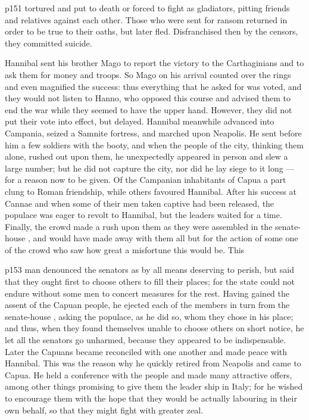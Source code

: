 p151 tortured and put to death or forced to fight as gladiators, pitting friends and relatives against each other. Those who were sent for ransom returned in order to be true to their oaths, but later fled. Disfranchised then by the censors, they committed suicide.

Hannibal sent his brother Mago to report the victory to the Carthaginians and to ask them for money and troops. So Mago on his arrival counted over the rings and even magnified the success: thus everything that he asked for was voted, and they would not listen to Hanno, who opposed this course and advised them to end the war while they seemed to have the upper hand. However, they did not put their vote into effect, but delayed. Hannibal meanwhile advanced into Campania, seized a Samnite fortress, and marched upon Neapolis. He sent before him a few soldiers with the booty, and when the people of the city, thinking them alone, rushed out upon them, he unexpectedly appeared in person and slew a large number; but he did not capture the city, nor did he lay siege to it long \texthebrew{—} for a reason now to be given. Of the Campanian inhabitants of Capua a part clung to Roman friendship, while others favoured Hannibal. After his success at Cannae and when some of their men taken captive had been released, the populace was eager to revolt to Hannibal, but the leaders waited for a time. Finally, the crowd made a rush upon them as they were assembled in the senate-house , and would have made away with them all but for the action of some one of the crowd who saw how great a misfortune this would be. This

p153 man denounced the senators as by all means deserving to perish, but said that they ought first to choose others to fill their places; for the state could not endure without some men to concert measures for the rest. Having gained the assent of the Capuan people, he ejected each of the members in turn from the senate-house , asking the populace, as he did so, whom they chose in his place; and thus, when they found themselves unable to choose others on short notice, he let all the senators go unharmed, because they appeared to be indispensable. Later the Capuans became reconciled with one another and made peace with Hannibal. This was the reason why he quickly retired from Neapolis and came to Capua. He held a conference with the people and made many attractive offers, among other things promising to give them the leader ­ship in Italy; for he wished to encourage them with the hope that they would be actually labouring in their own behalf, so that they might fight with greater zeal.

